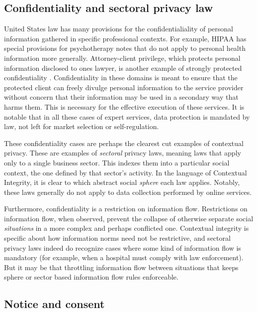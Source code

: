 \documentclass[../thesis.tex]{subfiles}
\begin{document}
\subsection{Confidentiality and sectoral privacy law}
\label{sec:confidentiality}

United States law has many provisions for the
confidentialiality of personal information gathered
in specific professional contexts.
For example, HIPAA has special provisions for
psychotherapy notes that do not apply to personal health
information more generally.
Attorney-client privilege, which protects personal information
disclosed to ones lawyer, is another example of strongly
protected confidentiality \cite{hazard1978historical} 
\cite{allen1990positive} \cite{richards2007privacy}.
Confidentiality in these domains is meant to ensure
that the protected client can freely divulge personal
information to the service provider without concern
that their information may be used in a secondary way
that harms them.
This is necessary for the effective execution of
these services.
It is notable that in all these cases of expert services,
data protection is mandated by law, not left for market
selection or self-regulation.

These confidentiality cases are perhaps the clearest
cut examples of contextual privacy.
These are examples of \emph{sectoral} privacy laws,
meaning laws that apply only to a single business sector.
This indexes them into a particular social context, the
one defined by that sector's activity.
In the language of Contextual Integrity,
it is clear to which abstract social \emph{sphere}
each law applies.
Notably, these laws generally do not apply to
data collection performed by online services.

Furthermore, confidentiality is a restriction on
information flow.
Restrictions on information flow, when observed,
prevent the collapse of otherwise separate
social \emph{situations} in a more complex and
perhaps conflicted one.
Contextual integrity is specific about
how information norms need not be restrictive,
and sectoral privacy laws indeed do recognize
cases where some kind of information flow
is mandatory (for example, when a hospital
must comply with law enforcement).
But it may be that throttling
information flow between situations that
keeps sphere or sector based information flow
rules enforceable.

\subsection{Notice and consent}
\end{document}
